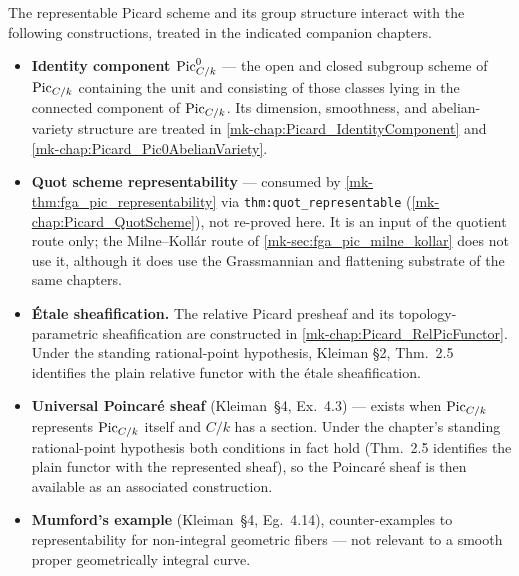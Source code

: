 The representable Picard scheme and its group structure interact with the
following constructions, treated in the indicated companion chapters.
\begin{itemize}
  \item \textbf{Identity component \(\operatorname{Pic}^0_{C/k}\)} --- the open and
    closed subgroup scheme of \(\operatorname{Pic}_{C/k}\) containing the unit and
    consisting of those classes lying in the connected component of
    \(\operatorname{Pic}_{C/k}\). Its dimension, smoothness, and abelian-variety
    structure are treated in \ref{mk-chap:Picard_IdentityComponent} and
    \ref{mk-chap:Picard_Pic0AbelianVariety}.
  \item \textbf{Quot scheme representability} --- consumed by
    \ref{mk-thm:fga_pic_representability} via \texttt{thm:quot\_representable}
    (\ref{mk-chap:Picard_QuotScheme}), not re-proved here. It is an input of the
    quotient route only; the Milne--Koll\'ar route of
    \ref{mk-sec:fga_pic_milne_kollar} does not use it, although it does use the
    Grassmannian and flattening substrate of the same chapters.
  \item \textbf{\'Etale sheafification.} The relative Picard presheaf and its
    topology-parametric sheafification are constructed in
    \ref{mk-chap:Picard_RelPicFunctor}. Under the
    standing rational-point hypothesis, Kleiman \S 2, Thm.~2.5 identifies
    the plain relative functor with the \'etale sheafification.
  \item \textbf{Universal Poincar\'e sheaf} (Kleiman~\S 4, Ex.~4.3)
    --- exists when \(\operatorname{Pic}_{C/k}\) represents \(\operatorname{Pic}_{C/k}\) itself and
    \(C/k\) has a section. Under the chapter's standing rational-point
    hypothesis both conditions in fact hold (Thm.~2.5 identifies the
    plain functor with the represented sheaf), so the Poincar\'e sheaf
    is then available as an associated construction.
  \item \textbf{Mumford's example} (Kleiman~\S 4, Eg.~4.14), counter-examples
    to representability for non-integral geometric fibers --- not
    relevant to a smooth proper geometrically integral curve.
\end{itemize}
